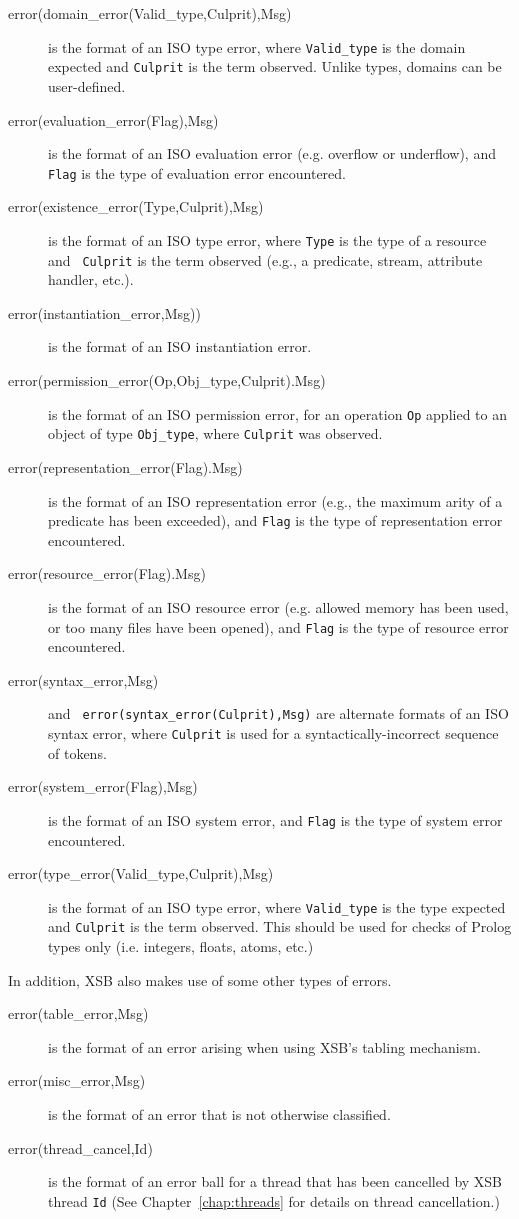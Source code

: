 \begin{description}
\item [error(domain\_error(Valid\_type,Culprit),Msg)] is the format of
  an ISO type error, where {\tt Valid\_type} is the domain expected
  and {\tt Culprit} is the term observed.  Unlike types, domains can
  be user-defined.
%
\item[error(evaluation\_error(Flag),Msg)] is the format of an ISO
  evaluation error (e.g. overflow or underflow), and {\tt Flag} is the
  type of evaluation error encountered.
%
\item [error(existence\_error(Type,Culprit),Msg)] is the format of an
  ISO type error, where {\tt Type} is the type of a resource and {\tt
    Culprit} is the term observed (e.g., a predicate, stream,
  attribute handler, etc.).
%
\item[error(instantiation\_error,Msg))] is the format of an ISO
  instantiation error.
%
\item [error(permission\_error(Op,Obj\_type,Culprit).Msg)] is the format of
  an ISO permission error, for an operation {\tt Op} applied to an
  object of type {\tt Obj\_type}, where {\tt Culprit} was observed.
%
\item[error(representation\_error(Flag).Msg)] is the format of an ISO
  representation error (e.g., the maximum arity of a predicate has
  been exceeded), and {\tt Flag} is the type of representation error
  encountered.
%
\item[error(resource\_error(Flag).Msg)] is the format of an ISO
  resource error (e.g. allowed memory has been used, or too many files
  have been opened), and {\tt Flag} is the type of resource error
  encountered.
%
\item[error(syntax\_error,Msg)] and {\tt
  error(syntax\_error(Culprit),Msg)} are alternate formats of an ISO
  syntax error, where {\tt Culprit} is used for a
  syntactically-incorrect sequence of tokens.
%
\item[error(system\_error(Flag),Msg)] is the format of an ISO system error,
  and {\tt Flag} is the type of system error encountered.
%
\item[error(type\_error(Valid\_type,Culprit),Msg)] is the format of an
  ISO type error, where {\tt Valid\_type} is the type expected and
  {\tt Culprit} is the term observed.  This should be used for checks
  of Prolog types only (i.e. integers, floats, atoms, etc.)
%
\end{description}

\noindent
In addition, XSB also makes use of some other types of errors.
%
\begin{description}
\item[error(table\_error,Msg)] is the format of an error arising when
  using XSB's tabling mechanism.
%
\item[error(misc\_error,Msg)] is the format of an error that is not
  otherwise classified.
%
\item[error(thread\_cancel,Id)] is the format of an error ball for a
  thread that has been cancelled by XSB thread {\tt Id} (See
  Chapter~\ref{chap:threads} for details on thread cancellation.)
%
\end{description}

